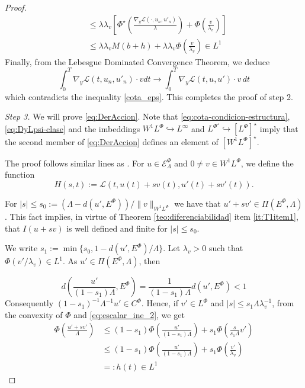 \documentclass[twoside]{article}
\theoremstyle{remark}
\newcommand{\lphi}{L^{\Phi}}
\newcommand{\lpsi}{L^{\Phi^{\star}}}
\newcommand{\ephi}{E^{\Phi}}
\newcommand{\wphi}{W^{1}\lphi}
\newcommand{\sobnor}{\|_{W^{1}\lphi}}
\newcommand{\domi}{\mathcal{E}^{\Phi}}
\renewcommand{\leq}{\leqslant}
\begin{document}
\begin{proof}
\begin{equation}
\begin{split}
&\leq 
\lambda\lambda_v\left[\Phi^{\star}\left(\frac{\nabla_y\mathcal{L}(\cdot,u_{n},u'_{n})}{\lambda}\right)+\Phi\left(\frac{v}{\lambda_v}\right)\right]
\\
&\leq \lambda\lambda_v M (b+h)+\lambda\lambda_v  \Phi\left(\frac{v}{\lambda_v}\right)\in L^1
\end{split}
\end{equation}
  Finally, from the Lebesgue Dominated Convergence Theorem, we deduce
\begin{equation}\label{conv_debil}
\int_0^T  \nabla_y\mathcal{L}(t,u_{n},u'_{n})
\cdot  v dt
\to 
\int_0^T \nabla_y\mathcal{L}(t,u,u')\cdot v\, dt \end{equation}
which contradicts the inequality \eqref{cota_eps}. This completes the proof of step 2.

\emph{Step 3.} We will prove \eqref{eq:DerAccion}. 
 Note that \eqref{eq:cota-condicion-estructura},  \eqref{eq:DyLpsi-clase} and the imbeddings $\wphi \hookrightarrow L^{\infty}$ and  
$\lpsi\hookrightarrow  \left[\lphi\right]^{\star}$ imply that the second member of
\eqref{eq:DerAccion} defines an element of $\left[\wphi\right]^{\star}$.

The proof follows similar lines as \cite[Thm. 1.4]{mawhin2010critical}. 
For $u\in \domi_{\Lambda}$ and $0\neq v\in\wphi$, we define the function
\[H(s,t):=\mathcal{L}(t,u(t)+s v(t),u'(t)+sv'(t)).\]



For  $|s|\leq s_0:=\left(\Lambda-d(u',\ephi)\right)/\|v\sobnor$  we have that  $u'+sv' \in \Pi(\ephi,\Lambda)$. 
This fact implies, in virtue of Theorem \ref{teo:diferenciabilidad} item \ref{it:T1item1}, 
that $I(u+s v)$ is well defined and finite for $|s|\leq s_0$. 



We write $s_1:=\min\{s_0,1-d(u',\ephi)/\Lambda\}$. Let $\lambda_v>0$ such that $\Phi(v'/\lambda_v)\in L^1$. As $u'\in\Pi(\ephi,\Lambda)$, then

\[
d\left(\frac{u'}{(1-s_1)\Lambda},E^{\Phi}\right)=\frac{1}{(1-s_1)\Lambda}d(u', E^{\Phi})<1
\]
Consequently  $(1-s_1)^{-1}\Lambda^{-1}u'\in C^\Phi$. Hence,  if $v'\in\lphi$ and $|s|\leq s_1 \Lambda\lambda_v^{-1}$, from the convexity of $\Phi$ and \ref{eq:escalar_ine_2}, we get
\begin{equation}\label{eq:cota-u+sv}
\begin{split}
\Phi\left(\frac{u'+sv'}{\Lambda}\right)&
\leq
(1-s_1)\Phi\left(\frac{u'}{(1-s_1)\Lambda}\right)+s_1 \Phi\left(\frac{s}{s_1\Lambda}v'\right)
\\
&\leq
(1-s_1)\Phi\left(\frac{u'}{(1-s_1)\Lambda}\right)+s_1 \Phi\left(\frac{v'}{\lambda_v}\right)\\
&=:h(t) \in L^1
\end{split}
\end{equation}




\end{proof}
\end{document}
